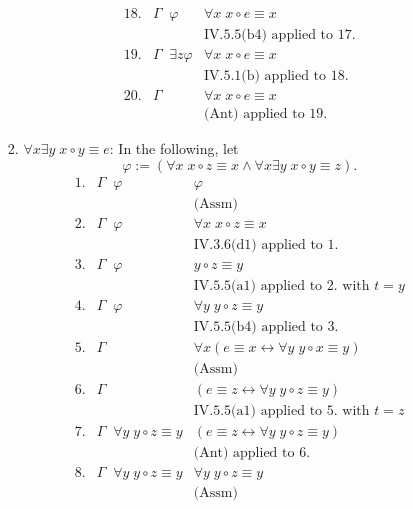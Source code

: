 \begin{enumerate}[1.]
\begin{enumerate}[(i)]
\begin{enumerate}
\[\begin{array}{lll}
18.& \Gamma \;\; \varphi & \forall x \; x \circ e \equiv x \\
\  & \                   & \mbox{IV.5.5(b4) applied to 17.} \\
19.& \Gamma \;\; \exists z \varphi & \forall x \; x \circ e \equiv x \\
\  & \                   & \mbox{IV.5.1(b) applied to 18.} \\
20.& \Gamma              & \forall x \; x \circ e \equiv x \\
\  & \                   & \mbox{(Ant) applied to 19.}
\end{array}
\]
\item $\forall x \exists y \; x \circ y \equiv e$: In the following, let
\[
\varphi := (\forall x \; x \circ z \equiv x \land \forall x \exists y \; x \circ y \equiv z).
\]
\[
\begin{array}{lll}
1. & \Gamma \;\; \varphi & \varphi \\
\  & \                   & \mbox{(Assm)} \\
2. & \Gamma \;\; \varphi & \forall x \; x \circ z \equiv x \\
\  & \                   & \mbox{IV.3.6(d1) applied to 1.} \\
3. & \Gamma \;\; \varphi & y \circ z \equiv y \\
\  & \                   & \mbox{IV.5.5(a1) applied to 2. with $t = y$} \\
4. & \Gamma \;\; \varphi & \forall y \; y \circ z \equiv y \\
\  & \                   & \mbox{IV.5.5(b4) applied to 3.} \\
5. & \Gamma              & \forall x (e \equiv x \leftrightarrow \forall y \; y \circ x \equiv y) \\
\  & \                   & \mbox{(Assm)} \\
6. & \Gamma              & (e \equiv z \leftrightarrow \forall y \; y \circ z \equiv y) \\
\  & \                   & \mbox{IV.5.5(a1) applied to 5. with $t = z$} \\
7. & \Gamma \;\; \forall y \; y \circ z \equiv y & (e \equiv z \leftrightarrow \forall y \; y \circ z \equiv y) \\
\  & \                   & \mbox{(Ant) applied to 6.} \\
8. & \Gamma \;\; \forall y \; y \circ z \equiv y & \forall y \; y \circ z \equiv y \\
\  & \                   & \mbox{(Assm)} \\

\end{array}\]
\end{enumerate}
\end{enumerate}
\end{enumerate}

